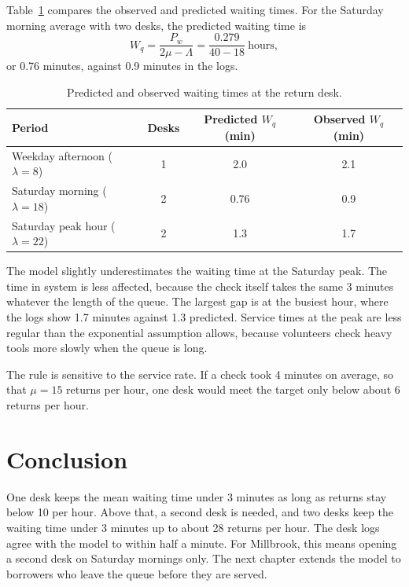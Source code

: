 Table~\ref{tab:logs} compares the observed and predicted waiting times.
For the Saturday morning average with two desks, the predicted waiting time is
\begin{equation}
  W_q = \frac{P_w}{2\mu - \Lambda} = \frac{0.279}{40 - 18}\ \text{hours},
  \label{eq:saturday}
\end{equation}
or 0.76 minutes, against 0.9 minutes in the logs.

\begin{table}[h]
  \centering
  \begin{tabular}{lccc}
    Period & Desks & Predicted $W_q$ (min) & Observed $W_q$ (min) \\
    \hline
    Weekday afternoon ($\lambda = 8$) & 1 & 2.0 & 2.1 \\
    Saturday morning ($\lambda = 18$) & 2 & 0.76 & 0.9 \\
    Saturday peak hour ($\lambda = 22$) & 2 & 1.3 & 1.7 \\
  \end{tabular}
  \caption{Predicted and observed waiting times at the return desk.}
  \label{tab:logs}
\end{table}

The model slightly underestimates the waiting time at the Saturday peak.
The time in system is less affected, because the check itself takes the same 3 minutes whatever the length of the queue.
The largest gap is at the busiest hour, where the logs show 1.7 minutes against 1.3 predicted.
Service times at the peak are less regular than the exponential assumption allows, because volunteers check heavy tools more slowly when the queue is long.

The rule is sensitive to the service rate.
If a check took 4 minutes on average, so that $\mu = 15$ returns per hour, one desk would meet the target only below about 6 returns per hour.

\section{Conclusion}
\label{sec:conclusion}

One desk keeps the mean waiting time under 3 minutes as long as returns stay below 10 per hour.
Above that, a second desk is needed, and two desks keep the waiting time under 3 minutes up to about 28 returns per hour.
The desk logs agree with the model to within half a minute.
For Millbrook, this means opening a second desk on Saturday mornings only.
The next chapter extends the model to borrowers who leave the queue before they are served.
